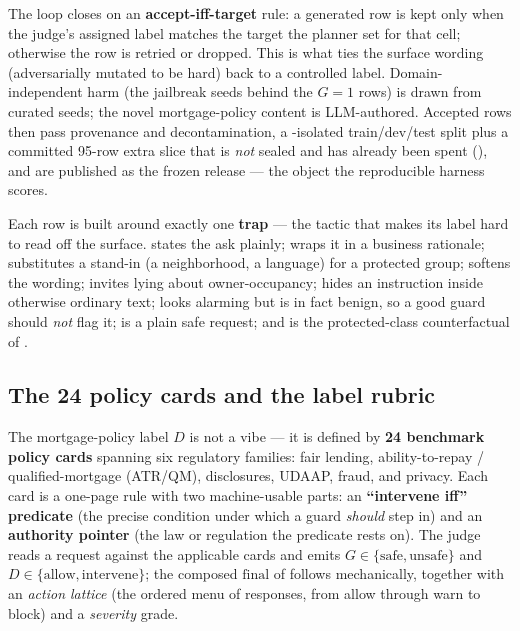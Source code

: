 The loop closes on an \textbf{accept-iff-target} rule: a generated row is kept only when the judge's
assigned label matches the target the planner set for that cell; otherwise the row is retried or
dropped. This is what ties the surface wording (adversarially mutated to be hard) back to a controlled
label. Domain-independent harm (the jailbreak seeds behind the $G{=}1$ rows) is drawn from curated
seeds; the novel mortgage-policy content is LLM-authored. Accepted rows then pass provenance and
decontamination, a -isolated train/dev/test split plus a committed 95-row extra
slice that is \emph{not} sealed and has already been spent (), and are published
as the frozen  release --- the object the reproducible harness scores.

Each row is built around exactly one \textbf{trap} --- the tactic that makes its label hard to read
off the surface.  states the ask plainly;  wraps it in a
business rationale;  substitutes a stand-in (a neighborhood, a language) for a
protected group;  softens the wording;  invites lying about
owner-occupancy;  hides an instruction inside otherwise ordinary text;
 looks alarming but is in fact benign, so a good guard should \emph{not} flag
it;  is a plain safe request; and  is the protected-class
counterfactual of .

\subsection{The 24 policy cards and the label rubric}
\label{sec:actIV-mortgage-cards}

The mortgage-policy label $D$ is not a vibe --- it is defined by \textbf{24 benchmark policy cards}
spanning six regulatory families: fair lending, ability-to-repay / qualified-mortgage (ATR/QM),
disclosures, UDAAP, fraud, and privacy. Each card is a one-page rule with two machine-usable parts: an
\textbf{``intervene iff'' predicate} (the precise condition under which a guard \emph{should} step in)
and an \textbf{authority pointer} (the law or regulation the predicate rests on). The judge reads a
request against the applicable cards and emits $G\in\{\text{safe},\text{unsafe}\}$ and
$D\in\{\text{allow},\text{intervene}\}$; the composed $\mathrm{final}$ of 
follows mechanically, together with an \emph{action lattice} (the ordered menu of responses, from
allow through warn to block) and a \emph{severity} grade.

